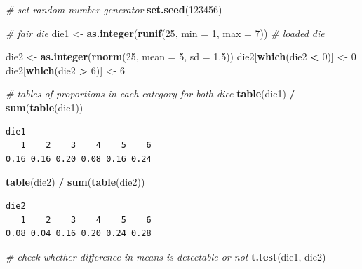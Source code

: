 \documentclass[]{article}
\newenvironment{Shaded}{\begin{snugshade}}{\end{snugshade}}
\newcommand{\KeywordTok}[1]{\textcolor[rgb]{0.13,0.29,0.53}{\textbf{#1}}}
\newcommand{\DataTypeTok}[1]{\textcolor[rgb]{0.13,0.29,0.53}{#1}}
\newcommand{\DecValTok}[1]{\textcolor[rgb]{0.00,0.00,0.81}{#1}}
\newcommand{\FloatTok}[1]{\textcolor[rgb]{0.00,0.00,0.81}{#1}}
\newcommand{\StringTok}[1]{\textcolor[rgb]{0.31,0.60,0.02}{#1}}
\newcommand{\CommentTok}[1]{\textcolor[rgb]{0.56,0.35,0.01}{\textit{#1}}}
\newcommand{\OperatorTok}[1]{\textcolor[rgb]{0.81,0.36,0.00}{\textbf{#1}}}
\newcommand{\NormalTok}[1]{#1}
\theoremstyle{definition}
\theoremstyle{definition}
\theoremstyle{definition}
\theoremstyle{remark}
\begin{document}
\begin{Shaded}
\begin{Highlighting}[]
\CommentTok{# set random number generator}
\KeywordTok{set.seed}\NormalTok{(}\DecValTok{123456}\NormalTok{)}

\CommentTok{# fair die}
\NormalTok{die1 <-}\StringTok{ }\KeywordTok{as.integer}\NormalTok{(}\KeywordTok{runif}\NormalTok{(}\DecValTok{25}\NormalTok{, }\DataTypeTok{min =} \DecValTok{1}\NormalTok{, }\DataTypeTok{max =} \DecValTok{7}\NormalTok{))}
\CommentTok{# loaded die}

\NormalTok{die2 <-}\StringTok{ }\KeywordTok{as.integer}\NormalTok{(}\KeywordTok{rnorm}\NormalTok{(}\DecValTok{25}\NormalTok{, }\DataTypeTok{mean =} \DecValTok{5}\NormalTok{, }\DataTypeTok{sd =} \FloatTok{1.5}\NormalTok{))}
\NormalTok{die2[}\KeywordTok{which}\NormalTok{(die2 }\OperatorTok{<}\StringTok{ }\DecValTok{0}\NormalTok{)] <-}\StringTok{ }\DecValTok{0}
\NormalTok{die2[}\KeywordTok{which}\NormalTok{(die2 }\OperatorTok{>}\StringTok{ }\DecValTok{6}\NormalTok{)] <-}\StringTok{ }\DecValTok{6}

\CommentTok{# tables of proportions in each category for both dice}
\KeywordTok{table}\NormalTok{(die1) }\OperatorTok{/}\StringTok{ }\KeywordTok{sum}\NormalTok{(}\KeywordTok{table}\NormalTok{(die1))}
\end{Highlighting}
\end{Shaded}

\begin{verbatim}
die1
   1    2    3    4    5    6 
0.16 0.16 0.20 0.08 0.16 0.24 
\end{verbatim}

\begin{Shaded}
\begin{Highlighting}[]
\KeywordTok{table}\NormalTok{(die2) }\OperatorTok{/}\StringTok{ }\KeywordTok{sum}\NormalTok{(}\KeywordTok{table}\NormalTok{(die2))}
\end{Highlighting}
\end{Shaded}

\begin{verbatim}
die2
   1    2    3    4    5    6 
0.08 0.04 0.16 0.20 0.24 0.28 
\end{verbatim}

\begin{Shaded}
\begin{Highlighting}[]
\CommentTok{# check whether difference in means is detectable or not}
\KeywordTok{t.test}\NormalTok{(die1, die2)}
\end{Highlighting}
\end{Shaded}
\end{document}
